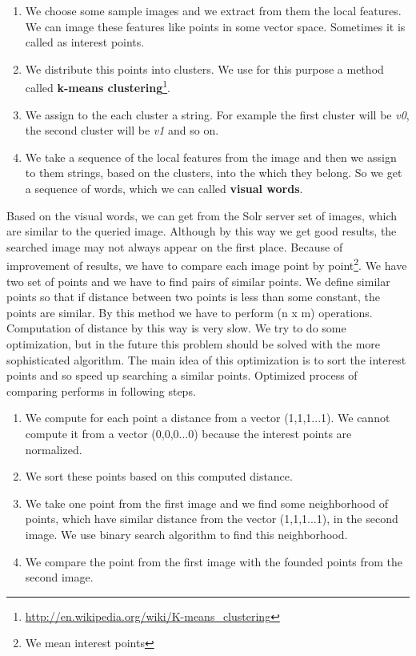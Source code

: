 \documentclass[12pt,a4paper]{report}
\begin{document}
\begin{enumerate}
\item We choose some sample images and we extract from them the local features. We can image these features like points in some vector space. Sometimes it is called as interest points.
\item We distribute this points into clusters. We use for this purpose a method called \textbf{k-means clustering}\footnote{\url{http://en.wikipedia.org/wiki/K-means_clustering}}.
\item We assign to the each cluster a string. For example the first cluster will be \textit{v0}, the second cluster will be \textit{v1} and so on.
\item We take a sequence of the local features from the image and then we assign to them strings, based on the clusters, into the which they belong. So we get a sequence of words, which we can called \textbf{visual words}.
\end{enumerate}

Based on the visual words, we can get from the Solr server set of images, which are similar to the queried image. Although by this way we get good results, the searched image may not always appear on the first place. Because of improvement of results, we have to compare each image point by point\footnote{We mean interest points}. We have two set of points and we have to find pairs of similar points. We define similar points so that if distance between two points is less than some constant, the points are similar. By this method we have to perform (n x m) operations. Computation of distance by this way is very slow. We try to do some optimization, but in the future this problem should be solved with the more sophisticated algorithm. The main idea of this optimization is to sort the interest points and so speed up searching a similar points. Optimized process of comparing performs in following steps.

\begin{enumerate}
\item We compute for each point a distance from a vector (1,1,1...1). We cannot compute it from a vector (0,0,0...0) because the interest points are normalized.
\item We sort these points based on this computed distance.
\item We take one point from the first image and we find some neighborhood of points, which have similar distance from the vector (1,1,1...1), in the second image. We use binary search algorithm to find this neighborhood.
\item We compare the point from the first image with the founded points from the second image.
\end{enumerate}
\end{document}
